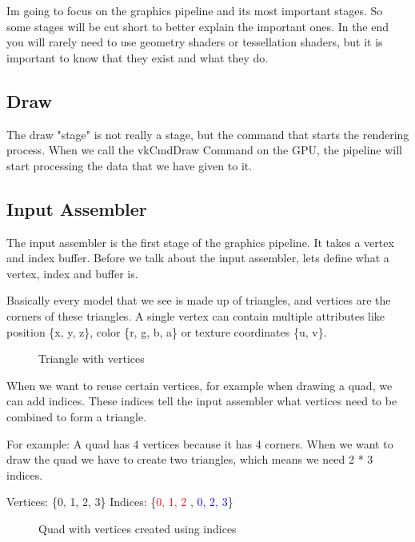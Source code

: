 \documentclass[12pt]{report} \usepackage{preamble}
\begin{document}
Im going to focus on the graphics pipeline and its most important stages.
So some stages will be cut short to better explain the important ones.
In the end you will rarely need to use geometry shaders or tessellation
shaders, but it is important to know that they exist and what they do.

\subsection{Draw}

The draw "stage" is not really a stage, but the command that starts
the rendering process. When we call the vkCmdDraw Command on the GPU,
the pipeline will start processing the data that we have given to
it. \cite{vulkan-spec-draw}

\subsection{Input Assembler}

The input assembler is the first stage of the graphics pipeline. It takes
a vertex and index buffer. \cite{vulkan-spec-pipelines} Before we talk
about the input assembler, lets define what a vertex, index and buffer is.

Basically every model that we see is made up of triangles, and vertices
are the corners of these triangles. A single vertex can contain multiple
attributes like position \{x, y, z\}, color \{r, g, b, a\} or texture
coordinates \{u, v\}. \cite{vulkan-vertex-input}

\begin{figure}[hbtp]
	\centering 
	\caption{Triangle with vertices}
\end{figure} \FloatBarrier

When we want to reuse certain vertices, for example when
drawing a quad, we can add indices.  These indices tell the
input assembler what vertices need to be combined to form a
triangle. \cite{vulkan-tutorial-index-buffer}

For example: A quad has 4 vertices because it has 4 corners. When we want
to draw the quad we have to create two triangles, which means we need 2 *
3 indices.

Vertices: \{0, 1, 2, 3\} Indices: \{\textcolor{red}{0, 1, 2} ,
\textcolor{blue}{0, 2, 3}\}

\begin{figure}[hbtp]
	\centering 
	\caption{Quad
		with vertices created using indices}
\end{figure} \FloatBarrier
\end{document}
